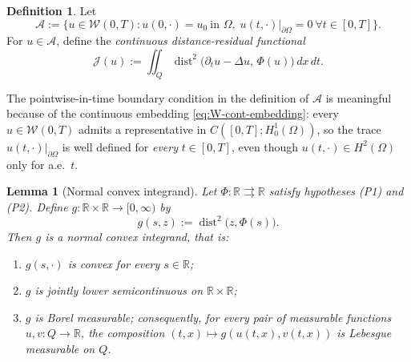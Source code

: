 \documentclass[11pt]{elsarticle}
\newtheorem{lemma}[theorem]{Lemma}
\theoremstyle{definition}
\newtheorem{definition}[theorem]{Definition}
\theoremstyle{remark}
\numberwithin{equation}{section}
\def\dist{\operatorname{dist}}
\begin{document}
	
	
	\begin{definition}\label{def:admissible-pde}
		Let
		\[
		\mathcal{A}
		:=
		\bigl\{u\in\mathcal{W}(0,T):
		u(0,\cdot)=u_0\ \text{in }\Omega,\;
		u(t,\cdot)|_{\partial\Omega}=0\ \forall t\in[0,T]
		\bigr\}.
		\]
		For $u\in\mathcal{A}$, define the \emph{continuous distance-residual
			functional}
		\[
		\mathcal{J}(u)
		:=
		\iint_{Q}\dist^2\bigl(\partial_t u-\Delta u,\,\Phi(u)\bigr)\,dx\,dt.
		\]
	\end{definition}
	The pointwise-in-time boundary condition in the definition of
	$\mathcal{A}$ is meaningful because of the continuous embedding
	\eqref{eq:W-cont-embedding}: every $u\in\mathcal{W}(0,T)$ admits a
	representative in $C([0,T];H^1_0(\Omega))$, so the trace
	$u(t,\cdot)|_{\partial\Omega}$ is well defined for \emph{every}
	$t\in[0,T]$, even though $u(t,\cdot)\in H^2(\Omega)$ only for a.e.\ $t$.
\begin{lemma}[Normal convex integrand]\label{lem:normal-integrand-parabolic}
	Let $\Phi:\mathbb{R}\rightrightarrows\mathbb{R}$ satisfy hypotheses (P1) and (P2).
	Define $g:\mathbb{R}\times\mathbb{R}\to[0,\infty)$ by
	\[
	g(s,z):=\operatorname{dist}^2\bigl(z,\Phi(s)\bigr).
	\]
	Then $g$ is a normal convex integrand, that is:
	\begin{enumerate}
		\item[(a)] $g(s,\cdot)$ is convex for every $s\in\mathbb{R}$;
		\item[(b)] $g$ is jointly lower semicontinuous on $\mathbb{R}\times\mathbb{R}$;
		\item[(c)] $g$ is Borel measurable; consequently, for every pair of measurable
		functions $u,v:Q\to\mathbb{R}$, the composition $(t,x)\mapsto g(u(t,x),v(t,x))$
		is Lebesgue measurable on $Q$.
	\end{enumerate}
\end{lemma}
\end{document}
